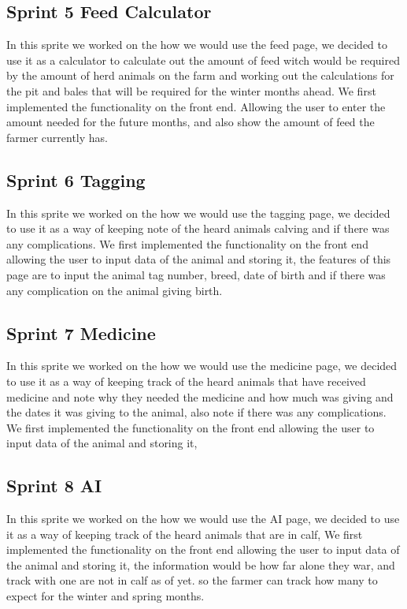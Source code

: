 \documentclass[12pt,a4paper,oneside,openany]{book}
\begin{document}
\subsection{Sprint 5 Feed Calculator}
In this sprite we worked on the how we would use the feed page, we decided to use it as a calculator to calculate out the amount of feed witch would be required by the amount of herd animals on the farm and working out the calculations for the pit and bales that will be required for the winter months ahead. We first implemented the functionality on the front end. Allowing the user to enter the amount needed for the future months, and also show the amount of feed the farmer currently has.

\subsection{Sprint 6 Tagging}
In this sprite we worked on the how we would use the tagging page, we decided to use it as a way of keeping note of the heard animals calving and if there was any complications. We first implemented the functionality on the front end allowing the user to input data of the animal and storing it, the features of this page are to input the animal tag number, breed, date of birth and if there was any complication on the animal giving birth. 

\subsection{Sprint 7 Medicine}
In this sprite we worked on the how we would use the medicine page, we decided to use it as a way of keeping track of the heard animals that have received medicine and note why they needed the medicine and how much was giving and the dates it was giving to the animal, also note if there was any complications. We first implemented the functionality on the front end allowing the user to input data of the animal and storing it,

\subsection{Sprint 8 AI}
In this sprite we worked on the how we would use the AI page, we decided to use it as a way of keeping track of the heard animals that are in calf, We first implemented the functionality on the front end allowing the user to input data of the animal and storing it, the information would be how far alone they war, and track with one are not in calf as of yet. so the farmer can track how many to expect for the winter and spring months.
\end{document}
